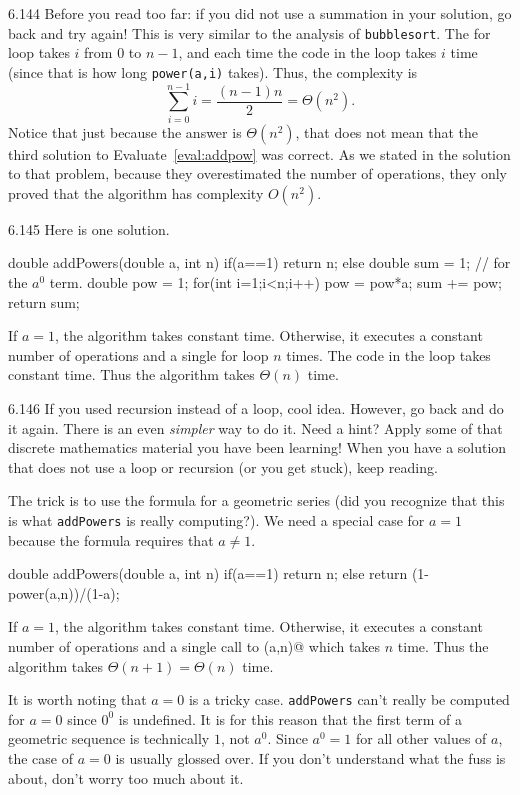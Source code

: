 \begin{Answer}{6.144}
Before you read too far:
if you did not use a summation in your solution, go back and try again!
This is very similar to the analysis of \verb+bubblesort+.  The for loop takes $i$ from
$0$ to $n-1$, and each time the code in the loop takes $i$ time (since that is how long
\verb+power(a,i)+ takes).  Thus, the complexity is
$$\sum_{i=0}^{n-1} i = \frac{(n-1)n}{2}=\Theta(n^2).$$
Notice that just because the answer is $\Theta(n^2)$, that does not mean that the
third solution to Evaluate~\ref{eval:addpow} was correct.  As we stated in the solution
to that problem, because they overestimated the number of operations,
they only proved that the algorithm has complexity $O(n^2)$.
\end{Answer}
\begin{Answer}{6.145}
Here is one solution.
\begin{code}
	  double addPowers(double a, int n) {
	      if(a==1) {
	          return n;
	      } else {
	          double sum = 1; // for the $a^0$ term.
	          double pow = 1;
	          for(int i=1;i<n;i++) {
	              pow = pow*a;
	              sum += pow;
	          }
	          return sum;
	      }
	  }
\end{code}
If $a=1$, the algorithm takes constant time.
Otherwise, it executes a constant number of operations and a single for loop $n$ times.
The code in the loop takes constant time.
Thus the algorithm takes $\Theta(n)$ time.
\end{Answer}
\begin{Answer}{6.146}
If you used recursion instead of a loop, cool idea.  However, go back and do it again.
There is an even {\em simpler} way to do it.  Need a hint?  Apply some of that
discrete mathematics material you have been learning!  When you have a solution that
does not use a loop or recursion (or you get stuck), keep reading.

The trick is to use the formula for a
geometric series (did you recognize that this is what \verb+addPowers+ is really computing?).
We need a special case for $a=1$ because the
formula requires that $a\neq 1$.

\begin{code}
	  double addPowers(double a, int n) {
	      if(a==1) {
	          return n;
	      } else {
	          return (1-power(a,n))/(1-a);
	      }
	  }
\end{code}

If $a=1$, the algorithm takes constant time.
Otherwise, it executes a constant number of operations and a single call
to \verb@power(a,n)@ which takes $n$ time.
Thus the algorithm takes $\Theta(n+1)=\Theta(n)$ time.

It is worth noting that $a=0$ is a tricky case.
\verb+addPowers+ can't really be computed for $a=0$ since $0^0$ is undefined.
It is for this reason that the first term of a geometric sequence is technically $1$, not $a^0$.
Since $a^0=1$ for all other values of $a$, the case of $a=0$ is usually glossed over.
If you don't understand what the fuss is about, don't worry too much about it.
\end{Answer}
